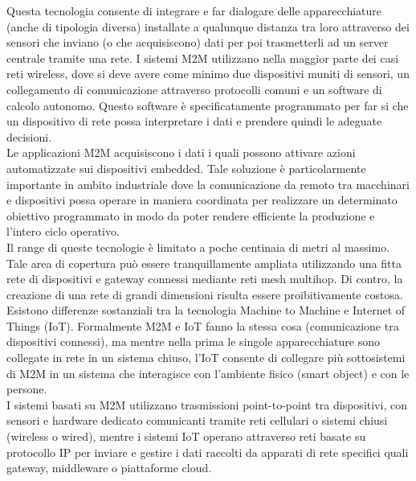 \noindent Questa tecnologia consente di integrare e far dialogare delle apparecchiature (anche di tipologia diversa) installate a qualunque distanza tra loro attraverso dei sensori che inviano (o che acquisiscono) dati per poi trasmetterli ad un server centrale tramite una rete. 
I sistemi M2M utilizzano nella maggior parte dei casi reti wireless, dove si deve avere come minimo due dispositivi muniti di sensori, un collegamento di comunicazione attraverso protocolli comuni e un software di calcolo autonomo. Questo software è specificatamente programmato per far si che un dispositivo di rete possa interpretare i dati e prendere quindi le adeguate decisioni.\\
Le applicazioni M2M acquisiscono i dati i quali possono attivare azioni automatizzate sui dispositivi embedded. Tale soluzione è particolarmente importante in ambito industriale dove la comunicazione da remoto tra macchinari e dispositivi possa operare in maniera coordinata per realizzare un determinato obiettivo programmato in modo da poter rendere efficiente la produzione e l’intero ciclo operativo.\\

\noindent Il range di queste tecnologie è limitato a poche centinaia di metri al massimo. Tale area di copertura può essere tranquillamente ampliata utilizzando una fitta rete di dispositivi e gateway connessi mediante reti mesh multihop. Di contro, la creazione di una rete di grandi dimensioni risulta essere proibitivamente costosa.\\

\noindent Esistono differenze sostanziali tra la tecnologia Machine to Machine e Internet of Things (IoT). Formalmente M2M e IoT fanno la stessa cosa (comunicazione tra dispositivi connessi), ma mentre nella prima le singole apparecchiature sono collegate in rete in un sistema chiuso, l'IoT consente di collegare più sottosistemi di M2M in un sistema che interagisce con l'ambiente fisico (smart object) e con le persone.\\
I sistemi basati su M2M utilizzano trasmissioni point-to-point tra dispositivi, con sensori e hardware dedicato comunicanti tramite reti cellulari o sistemi chiusi (wireless o wired), mentre i sistemi IoT operano attraverso reti basate su protocollo IP per inviare e gestire i dati raccolti da apparati di rete specifici quali gateway, middleware o piattaforme cloud.

